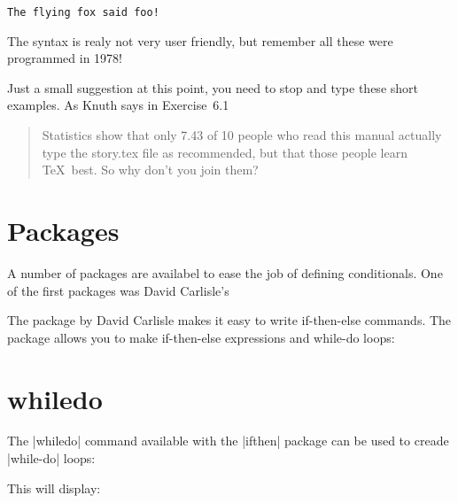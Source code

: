 \medskip
\verb*+The flying fox said foo!+
\medskip

The syntax is realy not very user friendly, but remember all these were programmed in 1978!


Just a small suggestion at this point, you need to stop and type these short examples. As Knuth says in Exercise~6.1 

\begin{quote} 
Statistics show that only 7.43 of 10 people who read this manual actually type
the story.tex file as recommended, but that those people learn \TeX\  best. So
why don't you join them?
\end{quote}

\section{Packages}

A number of packages are availabel to ease the job of defining conditionals. One of the first packages was David Carlisle's 

The package  by David Carlisle makes it easy to write if-then-else commands. 
The package allows you to make if-then-else expressions and
while-do loops:

\begin{teX}
\end{teX}



\section{whiledo}

The |whiledo| command available with the |ifthen| package can be used to creade |while-do| loops:


\begin{teX}
\end{teX}

\noindent This will display:
\medskip

{
}


\begin{teX}


\end{teX}


